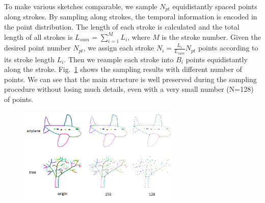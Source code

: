 To make various sketches comparable, we sample $N_{pt}$ equidistantly spaced points along strokes.
By sampling along strokes, the temporal information is encoded in the point distribution.
%
The length of each stroke is calculated and the total length of all strokes is $L_{sum}=\sum^{M}_{i=1} L_i$, where $M$ is the stroke number.
%
Given the desired point number $N_{pt}$, we assign each stroke $N_i=\frac{L_i}{L_{sum}}N_{pt}$ points according to its stroke length $L_i$.
Then we reample each stroke into $B_i$ points equidistantly along the stroke.
%
Fig.~\ref{fig:resample} shows the sampling results with different number of points.
We can see that the main structure is well preserved during the sampling procedure without losing much details, even with a very small number (N=128) of points.

\begin{figure}
	\center
	\includegraphics[width=3in]{images/resample2.png}
	\label{fig:resample}
\end{figure}



